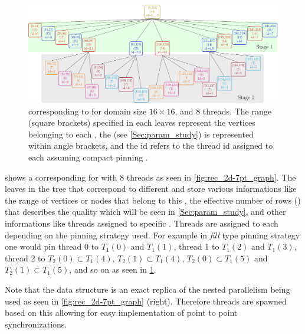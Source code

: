 	 \begin{figure}[thbp]
		 \includegraphics[width=\textwidth, height=0.2\textheight]{pics/recursion/2d-7pt_example/tree/tree}
	 	\caption{\levelTree corresponding to \stex for domain size $16 \times 16$, and 8 threads. The range (square brackets) specified in each leaves represent the vertices belonging to each \levelGroup, the \nrowsEff (see \cref{Sec:param_study}) is represented within angle brackets, and the id refers to the thread id assigned to each \levelGroups assuming compact pinning .}
	 	\label{fig:rec_2d-7pt_tree}
	 \end{figure}

 
  shows a \levelTree corresponding for \stex  with 8 threads as seen in \cref{fig:rec_2d-7pt_graph}. The leaves in the tree that correspond to different \levelGroups and store various informations like the range of vertices or nodes that belong to this \levelGroup, the effective number of rows (\nrowsEff) that describes the quality which will be seen in \cref{Sec:param_study}, and other informations like threads assigned to specific \levelGroups.  Threads are assigned to each \levelGroup depending on the pinning strategy used. For example in \emph{fill} type pinning strategy one would pin thread 0 to $T_1(0)$ and $T_1(1)$, thread 1 to $T_1(2)$ and $T_1(3)$, thread 2 to $T_2(0)  \subset T_1(4)$, $T_2(1) \subset T_1(4)$, $T_2(0)  \subset T_1(5)$ and $T_2(1) \subset T_1(5)$, and so on as seen in \cref{fig:rec_2d-7pt_tree}. 
 
 Note that the \levelTree data structure is an exact replica of the nested parallelism being used as seen in \cref{fig:rec_2d-7pt_graph} (right). Therefore threads are spawned based on this \levelTree allowing for easy implementation of point to point synchronizations.


